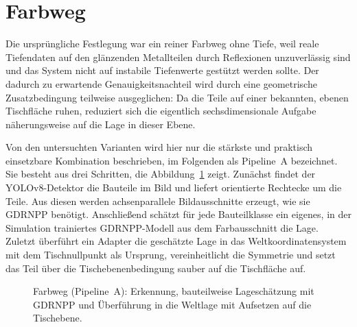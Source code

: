 \documentclass[oneside,studentpaper]{wbk}
\begin{document}
\section{Farbweg}
\label{sec:rgb}

Die ursprüngliche Festlegung war ein reiner Farbweg ohne Tiefe, weil reale
Tiefendaten auf den glänzenden Metallteilen durch Reflexionen unzuverlässig sind
und das System nicht auf instabile Tiefenwerte gestützt werden sollte. Der dadurch
zu erwartende Genauigkeitsnachteil wird durch eine geometrische Zusatzbedingung
teilweise ausgeglichen: Da die Teile auf einer bekannten, ebenen Tischfläche
ruhen, reduziert sich die eigentlich sechsdimensionale Aufgabe näherungsweise auf
die Lage in dieser Ebene.

Von den untersuchten Varianten wird hier nur die stärkste und praktisch
einsetzbare Kombination beschrieben, im Folgenden als Pipeline~A bezeichnet. Sie
besteht aus drei Schritten, die Abbildung~\ref{fig:rgbpipe} zeigt. Zunächst findet
der YOLOv8-Detektor die Bauteile im Bild und liefert orientierte Rechtecke um die
Teile. Aus diesen werden achsenparallele Bildausschnitte erzeugt, wie sie GDRNPP
benötigt. Anschließend schätzt für jede Bauteilklasse ein eigenes, in der
Simulation trainiertes GDRNPP-Modell aus dem Farbausschnitt die Lage. Zuletzt
überführt ein Adapter die geschätzte Lage in das Weltkoordinatensystem mit dem
Tischnullpunkt als Ursprung, vereinheitlicht die Symmetrie und setzt das Teil
über die Tischebenenbedingung sauber auf die Tischfläche auf.

\begin{figure}[H]
\centering
{}
\caption{Farbweg (Pipeline~A): Erkennung, bauteilweise Lageschätzung mit GDRNPP
und Überführung in die Weltlage mit Aufsetzen auf die Tischebene.}
\label{fig:rgbpipe}
\end{figure}
\end{document}
